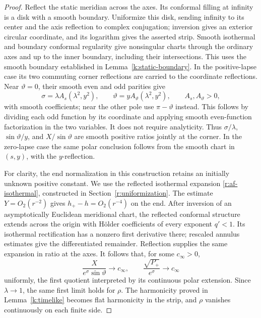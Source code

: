 \begin{proof}
Reflect the static meridian across the axes. Its conformal filling
at infinity is a disk with a smooth boundary. Uniformize this
disk, sending infinity to its center and the axis reflection to
complex conjugation; inversion gives an exterior circular
coordinate, and its logarithm gives the asserted strip.
Smooth isothermal and boundary conformal regularity give
nonsingular charts through the ordinary axes and up to the inner
boundary, including their intersections. This uses the smooth
boundary established in Lemma~\ref{k:static-boundary}.
In the positive-lapse case its two commuting corner reflections
are carried to the coordinate reflections. Near
\(\vartheta=0\), their smooth even and odd parities give
\begin{equation}\label{k:corner-chart}
 \sigma=\lambda A_s(\lambda^2,y^2),\qquad
 \vartheta=yA_\vartheta(\lambda^2,y^2),\qquad
 A_s,A_\vartheta>0 ,
\end{equation}
with smooth coefficients; near the other pole use
\(\pi-\vartheta\) instead. This follows by dividing each odd
function by its coordinate and applying smooth even-function
factorization in the two variables. It does not require
analyticity. Thus \(\sigma/\lambda\), \(\sin\vartheta/y\), and
\(X/\sin\vartheta\) are smooth positive ratios jointly at the
corner. In the zero-lapse case the same polar conclusion follows
from the smooth chart in \((s,y)\), with the \(y\)-reflection.

For clarity, the end normalization in this construction retains an
initially unknown positive constant. We use the reflected
isothermal expansion \eqref{r:af-isothermal}, constructed in
Section~\ref{r:uniformization}. The estimate
\(Y=O_2(r^{-2})\) gives \(h_+-h=O_2(r^{-4})\) on the end.
After inversion of an asymptotically Euclidean meridional chart,
the reflected conformal structure extends across the origin with
H\"older coefficients of every exponent \(q'<1\).
Its isothermal rectification has a nonzero first derivative there;
rescaled annulus estimates give the differentiated remainder.
Reflection supplies the same expansion in ratio at the axes.
It follows that, for some \(c_\infty>0\),
\[
 \frac{X}{e^\sigma\sin\vartheta}\longrightarrow c_\infty,
 \qquad
 \frac{\sqrt{P_+}}{e^\sigma}\longrightarrow c_\infty
\]
uniformly, the first quotient interpreted by its continuous polar
extension. Since \(\lambda\to1\), the same first limit holds for
\(\rho\). The harmonicity proved in Lemma~\ref{k:timelike} becomes
flat harmonicity in the strip, and \(\rho\) vanishes continuously
on each finite side.


\end{proof}
